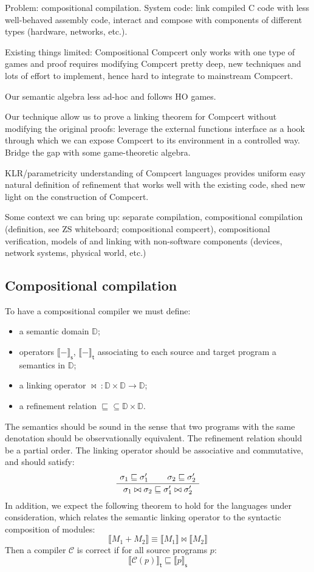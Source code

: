 \documentclass[sigplan,10pt,review,anonymous]{acmart}
\newcommand{\kw}[1]{\ensuremath{ \textsf{#1} }}
\begin{document}
Problem:
compositional compilation.
System code:
link compiled C code with less well-behaved assembly code,
interact and compose with components of different types
(hardware, networks, etc.).

Existing things limited:
Compositional Compcert only works with one type of games
and proof requires modifying Compcert pretty deep,
new techniques and lots of effort to implement,
hence hard to integrate to mainstream Compcert.

Our semantic algebra less ad-hoc and follows HO games.

Our technique allow us to prove a linking theorem for Compcert
without modifying the original proofs:
leverage the external functions interface as a hook
through which we can expose Compcert to its environment in a controlled way.
Bridge the gap with some game-theoretic algebra.

KLR/parametricity understanding of Compcert languages provides
uniform easy natural definition of refinement
that works well with the existing code,
shed new light on the construction of Compcert.

Some context we can bring up:
separate compilation,
compositional compilation (definition, see ZS whiteboard; compositional compcert),
compositional verification,
models of and linking with non-software components
(devices, network systems, physical world, etc.)

\subsection{Compositional compilation}

To have a compositional compiler we must define:
\begin{itemize}
\item a semantic domain $\mathbb{D}$;
\item operators $\llbracket - \rrbracket_\kw{s}$, $\llbracket - \rrbracket_\kw{t}$
  associating to each source and target program a semantics in $\mathbb{D}$;
\item a linking operator $\bowtie \: : \mathbb{D} \times \mathbb{D} \rightarrow \mathbb{D}$;
\item a refinement relation ${\sqsubseteq} \subseteq \mathbb{D} \times \mathbb{D}$.
\end{itemize}
The semantics should be sound in the sense that
two programs with the same denotation should be observationally equivalent.
The refinement relation should be a partial order.
The linking operator should be associative and commutative,
and should satisfy:
\[
  \AxiomC{$\sigma_1 \sqsubseteq \sigma_1'$}
  \AxiomC{$\sigma_2 \sqsubseteq \sigma_2'$}
  \BinaryInfC{$\sigma_1 \bowtie \sigma_2 \sqsubseteq \sigma_1' \bowtie \sigma_2'$}
  \DisplayProof
\]
In addition,
we expect the following theorem to hold
for the languages under consideration,
which relates the semantic linking operator to
the syntactic composition of modules:
\[
  \llbracket M_1 + M_2 \rrbracket \equiv
  \llbracket M_1 \rrbracket \bowtie \llbracket M_2 \rrbracket
\]
Then a compiler $\mathcal{C}$ is correct if
for all source programs $p$:
\[
  \llbracket \mathcal{C}(p) \rrbracket_\kw{t} \sqsubseteq
  \llbracket p \rrbracket_\kw{s}
\]
\end{document}
